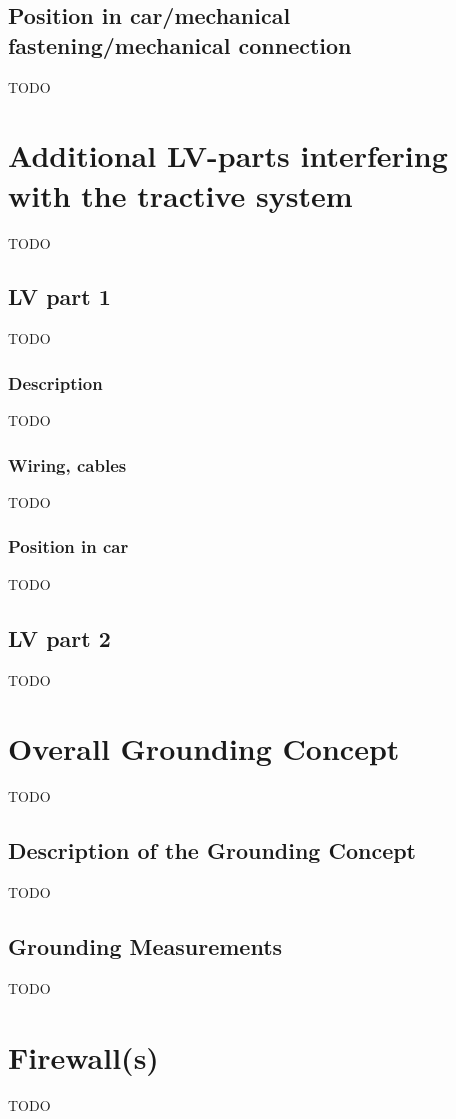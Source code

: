 \documentclass{article}
\begin{document}
\subsection{Position in car/mechanical fastening/mechanical connection}
TODO

\section{Additional LV-parts interfering with the tractive system}
TODO

\subsection{LV part 1}
TODO

\subsubsection{Description}
TODO

\subsubsection*{Wiring, cables}
TODO

\subsubsection{Position in car}
TODO

\subsection{LV part 2}
TODO

\section{Overall Grounding Concept}
TODO

\subsection{Description of the Grounding Concept}
TODO

\subsection{Grounding Measurements}
TODO

\section{Firewall(s)}
TODO
\end{document}
